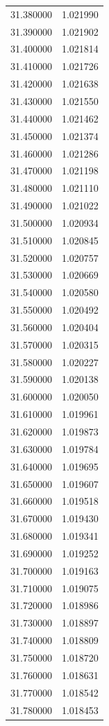 \begin{tabular}{rr}
31.380000 & 1.021990 \\
31.390000 & 1.021902 \\
31.400000 & 1.021814 \\
31.410000 & 1.021726 \\
31.420000 & 1.021638 \\
31.430000 & 1.021550 \\
31.440000 & 1.021462 \\
31.450000 & 1.021374 \\
31.460000 & 1.021286 \\
31.470000 & 1.021198 \\
31.480000 & 1.021110 \\
31.490000 & 1.021022 \\
31.500000 & 1.020934 \\
31.510000 & 1.020845 \\
31.520000 & 1.020757 \\
31.530000 & 1.020669 \\
31.540000 & 1.020580 \\
31.550000 & 1.020492 \\
31.560000 & 1.020404 \\
31.570000 & 1.020315 \\
31.580000 & 1.020227 \\
31.590000 & 1.020138 \\
31.600000 & 1.020050 \\
31.610000 & 1.019961 \\
31.620000 & 1.019873 \\
31.630000 & 1.019784 \\
31.640000 & 1.019695 \\
31.650000 & 1.019607 \\
31.660000 & 1.019518 \\
31.670000 & 1.019430 \\
31.680000 & 1.019341 \\
31.690000 & 1.019252 \\
31.700000 & 1.019163 \\
31.710000 & 1.019075 \\
31.720000 & 1.018986 \\
31.730000 & 1.018897 \\
31.740000 & 1.018809 \\
31.750000 & 1.018720 \\
31.760000 & 1.018631 \\
31.770000 & 1.018542 \\
31.780000 & 1.018453 \\

\end{tabular}
